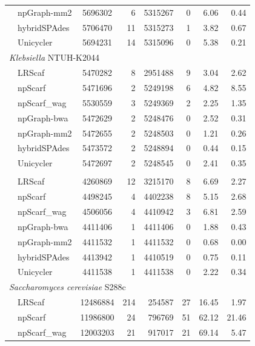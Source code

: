 \documentclass[10pt,letterpaper]{article}
\begin{document}
\begin{longtable}[!hpt]{llcrrrrr}
\rowcolor{Gray}
& npGraph-mm2 & 5696302  &  6  &  5315267  &  0  &  6.06 & 0.44\\*
\rowcolor{Gray}
& hybridSPAdes &  5706470 &  11  &  5315273  &  1  & 3.82  &  0.67\\*
\rowcolor{Gray}
& Unicycler &  5694231 &  14  &  5315096  &  0  & 5.38 &  0.21\\
\hline
\multicolumn{8}{l}{\emph{Klebsiella} NTUH-K2044} \\* %
\nobreakmidrule
& LRScaf & 5470282 & 8 & 2951488 & 9 & 3.04 & 2.62\\*
& npScarf & 5471696  &  2  &  5249198  &  6  & 4.82  &  8.55\\*
& npScarf\_wag & 5530559  &  3  &  5249369  &  2  &  2.25 &  1.35\\*
& npGraph-bwa & 5472629  &  2  &  5248476  & 0  & 2.52  &  0.31\\*
& npGraph-mm2 &  5472655 &  2  &  5248503  &  0 &  1.21 &  0.26\\*
& hybridSPAdes & 5473572  &  2  &  5248894  &  0  &  0.44 & 0.15\\*
& Unicycler & 5472697  & 2  & 5248545  &  0 & 2.41  &  0.35\\
\hline
\rowcolor{Gray}
\multicolumn{8}{l}{\emph{Mycobacterium tuberculosis} H37Rv} \\* %
\nobreakmidrule
\rowcolor{Gray}
& LRScaf & 4260869 & 12 & 3215170 & 8 & 6.69 & 2.27\\*
\rowcolor{Gray}
& npScarf &  4498245 &  4  & 4402238   &  8  & 5.15  & 2.68\\*
\rowcolor{Gray}
& npScarf\_wag &  4506056 &  4  &  4410942  &  3  & 6.81  & 2.59\\*
\rowcolor{Gray}
& npGraph-bwa & 4411406  &  1  &  4411406  &  0  & 1.88  & 0.43\\*
\rowcolor{Gray}
& npGraph-mm2 & 4411532  & 1   &  4411532  &  0  & 0.68  & 0.00\\*
\rowcolor{Gray}
& hybridSPAdes & 4413942  &  1  &  4410519  &  0  &  0.75 &  0.11\\*
\rowcolor{Gray}
& Unicycler & 4411538  &  1  &  4411538  &  0  &  2.22 &  0.34\\
\hline
\multicolumn{8}{l}{\emph{Saccharomyces cerevisiae} S288c} \\* %
\nobreakmidrule
& LRScaf & 12486884 & 214 & 254587 & 27 & 16.45 & 1.97\\*
& npScarf &  11986800 &  24  &  796769  &  51  &  62.12 & 21.46 \\*
& npScarf\_wag & 12003203  &  21  &  917017  &  21  & 69.14  & 5.47 \\*

\end{longtable}
\end{document}
